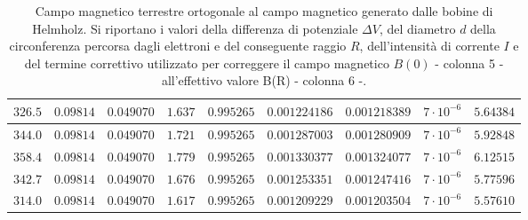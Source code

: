 \documentclass[]{article}
\begin{document}
\begin{table}[H]
\begin{tabular}{||c|c|c|c|c|c|c|c|c||}
        $326.5$ & $0.09814$ & $0.049070$ & $1.637$ & $0.995265$ & $0.001224186$ & $0.001218389$ & $7 \cdot 10^{-6}$ & $5.64384$ \\\hline
        $344.0$ & $0.09814$ & $0.049070$ & $1.721$ & $0.995265$ & $0.001287003$ & $0.001280909$ & $7 \cdot 10^{-6}$ & $5.92848$ \\\hline
        $358.4$ & $0.09814$ & $0.049070$ & $1.779$ & $0.995265$ & $0.001330377$ & $0.001324077$ & $7 \cdot 10^{-6}$ & $6.12515$ \\\hline
        $342.7$ & $0.09814$ & $0.049070$ & $1.676$ & $0.995265$ & $0.001253351$ & $0.001247416$ & $7 \cdot 10^{-6}$ & $5.77596$ \\\hline
        $314.0$ & $0.09814$ & $0.049070$ & $1.617$ & $0.995265$ & $0.001209229$ & $0.001203504$ & $7 \cdot 10^{-6}$ & $5.57610$ \\\hline
    
    \end{tabular}
    \caption{Campo magnetico terrestre ortogonale al campo magnetico generato dalle bobine di Helmholz. Si riportano i valori della differenza di potenziale $\Delta V$, del diametro $ d $ della circonferenza percorsa dagli elettroni e del conseguente raggio $ R $, dell'intensità di corrente $ I $ e del termine correttivo utilizzato per correggere il campo magnetico $B(0)$ - colonna 5 - all'effettivo valore B(R) - colonna 6 -.}
    \label{CM_ortogonale}
\end{table}
\end{document}
